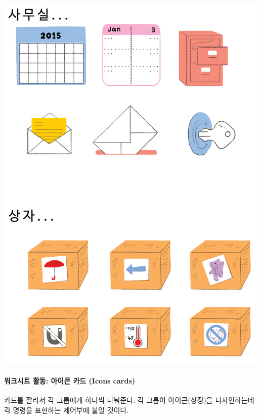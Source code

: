 \documentclass[]{article}
\begin{document}
\includegraphics{csunplugged/06-part/img/ch20-hci/19-hci-06-icons.png}

\mbox{}\paragraph{워크시트 활동: 아이콘 카드 (Icons cards)}\label{icons-cards}

카드를 잘라서 각 그룹에게 하나씩 나눠준다. 각 그룹이 아이콘(상징)을
디자인하는데 각 명령을 표현하는 제어부에 붙일 것이다.
\end{document}
